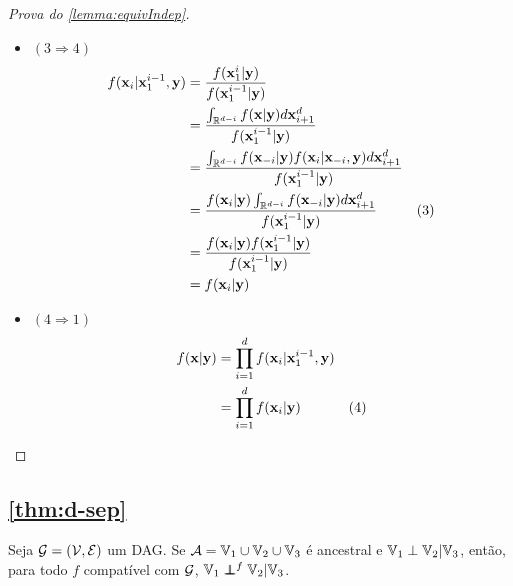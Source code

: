\begin{proof}[Prova do \cref{lemma:equivIndep}]
\begin{itemize}
 \vspace{-5mm}
 \item $(3 \Longrightarrow 4)$
 \begin{align*}
  f(\x_i|\x_1^{i-1},\y)	
  &= \frac{f(\x_1^{i}|\y)}{f(\x_1^{i-1}|\y)} \\
	&= \frac{\int_{\mathbb{R}^{d-i}}{f(\x|\y)}d\x_{i+1}^{d}}
	{f(\x_1^{i-1}|\y)} \\
	&= \frac{\int_{\mathbb{R}^{d-i}}{f(\x_{-i}|\y)f(\x_i|\x_{-i},\y)d\x_{i+1}^{d}}}
	{f(\x_1^{i-1}|\y)} \\
	&= \frac{f(\x_i|\y)\int_{\mathbb{R}^{d-i}}{f(\x_{-i}|\y)d\x_{i+1}^{d}}}
	{f(\x_1^{i-1}|\y)} & (3) \\
	&= \frac{f(\x_i|\y)f(\x_1^{i-1}|\y)}
	{f(\x_1^{i-1}|\y)} \\
	&= f(\x_i|\y)
 \end{align*}

 \item $(4 \Longrightarrow 1)$
 \begin{align*}
  f(\x|\y)	
  &= \prod_{i=1}^{d}{f(\x_i|\x_1^{i-1},\y)} \\
	&= \prod_{i=1}^{d}{f(\x_i|\y)} & (4)
 \end{align*}
 \end{itemize}
\end{proof}

\subsection{\cref{thm:d-sep}}

\begin{lemma}
 \label{lem:dsep_indep_anc}
 Seja $\sG = (\sV, \sE)$ um DAG.
 Se $\sA = \V_1 \cup \V_2 \cup \V_3$ é ancestral e
 $\V_1 \perp \V_2 | \V_3$, então, 
 para todo $f$ compatível com $\sG$,
 $\V_1 \ind^f \V_2 | \V_3$.
\end{lemma}


